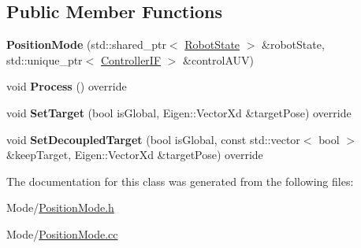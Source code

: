 \subsection*{Public Member Functions}
\begin{DoxyCompactItemize}
\item 
\mbox{\label{classproc__control_1_1_position_mode_aa0f0beda66599f422d0d2ea44fe9d1e1}} 
{\bfseries Position\+Mode} (std\+::shared\+\_\+ptr$<$ \hyperlink{classproc__control_1_1_robot_state}{Robot\+State} $>$ \&robot\+State, std\+::unique\+\_\+ptr$<$ \hyperlink{classproc__control_1_1_controller_i_f}{Controller\+IF} $>$ \&control\+A\+UV)
\item 
\mbox{\label{classproc__control_1_1_position_mode_a02d5e57b88eb2fc00e8b1eb2111a1f4f}} 
void {\bfseries Process} () override
\item 
\mbox{\label{classproc__control_1_1_position_mode_a35aedca126be447584bf44be01d66cd5}} 
void {\bfseries Set\+Target} (bool is\+Global, Eigen\+::\+Vector\+Xd \&target\+Pose) override
\item 
\mbox{\label{classproc__control_1_1_position_mode_a7f2224eb7984c83509ff961b97e71078}} 
void {\bfseries Set\+Decoupled\+Target} (bool is\+Global, const std\+::vector$<$ bool $>$ \&keep\+Target, Eigen\+::\+Vector\+Xd \&target\+Pose) override
\end{DoxyCompactItemize}


The documentation for this class was generated from the following files\+:\begin{DoxyCompactItemize}
\item 
Mode/\hyperlink{_position_mode_8h}{Position\+Mode.\+h}\item 
Mode/\hyperlink{_position_mode_8cc}{Position\+Mode.\+cc}\end{DoxyCompactItemize}
